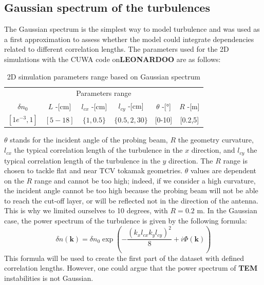 \documentclass[11pt,openany]{report}
\begin{document}
\begin{multicols}{2}
    \subsection{Gaussian spectrum of the turbulences}
    The Gaussian spectrum is the simplest way to model turbulence and was used as a first approximation to assess whether the model could integrate dependencies related to different correlation lengths. The parameters used for the 2D simulations with the CUWA code on\textbf{LEONARDOO}  are as follows:
    \setlength{\tabcolsep}{.008\linewidth}
    \begin{table}
        \begin{tabular}{c|c|c|c|c|c}
            \toprule
            \multicolumn{6}{c}{Parameters range}                                                     \\
            \cmidrule{1 -6}
            $\delta n_0$   & $L$ -[cm] & $l_{cx}$ -[cm] & $l_{cy}$ -[cm]  & $\theta$ -[°] & $R$ -[m] \\
            \midrule
            $[1e^{-3}, 1]$ & $[5-18]$  & $\{1, 0.5 \}$  & $\{0.5,2,30 \}$ & [0-10]        & [0.2,5]  \\
            \bottomrule
        \end{tabular}
        \caption{2D simulation parameters range based on Gaussian spectrum}
        \label{Gaussian_table}
    \end{table}

    $\theta$ stands for the incident angle of the probing beam, $R$ the geometry curvature, $l_{cx}$ the typical correlation length of the turbulence in the $x$ direction, and $l_{cy}$ the typical correlation length of the turbulence in the $y$ direction. The $R$ range is chosen to tackle flat and near TCV tokamak geometries. $\theta$ values are dependent on the $R$ range and cannot be too high; indeed, if we consider a high curvature, the incident angle cannot be too high because the probing beam will not be able to reach the cut-off layer, or will be reflected not in the direction of the antenna. This is why we limited ourselves to 10 degrees, with $R = 0.2$ m. In the Gaussian case, the power spectrum of the turbulence is given by the following formula:
    $$
        \delta n(\textbf{k} ) = \delta n_0 \exp\left(-\frac{(k_x l_{cx} k_y l_{cy})^2}{8} + i\Phi(\textbf{k} )\right)
    $$
    This formula will be used to create the first part of the dataset with defined correlation lengths. However, one could argue that the power spectrum of \textbf{TEM} instabilities is not Gaussian.


\end{multicols}
\end{document}

